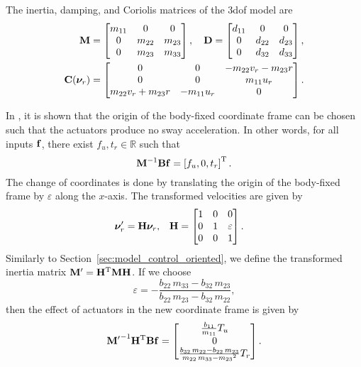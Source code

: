The inertia, damping, and Coriolis matrices of the 3\gls{dof} model are \cite{fredriksen_global_2006}
\begin{align}
    \mathbf{M} &= 
    \begin{bmatrix}
        m_{11} & 0 & 0 \\ 0 & m_{22} & m_{23} \\ 0 & m_{23} & m_{33}
    \end{bmatrix}, \quad
    \mathbf{D} =
    \begin{bmatrix}
        d_{11} & 0 & 0 \\ 0 & d_{22} & d_{23} \\ 0 & d_{32} & d_{33}
    \end{bmatrix}, \\
    \mathbf{C}(\bm{\nu}_r) &=
    \begin{bmatrix}
        0 & 0 & -m_{22}v_r - m_{23}r \\ 0 & 0 & m_{11}u_r \\ m_{22}v_r + m_{23}r & -m_{11}u_r & 0
    \end{bmatrix}.
\end{align}

In \cite{fredriksen_global_2006}, it is shown that the origin of the body-fixed coordinate frame can be chosen such that the actuators produce no sway acceleration.
In other words, for all inputs $\mathbf{f}$, there exist $f_u, t_r \in \mathbb{R}$ such that
\begin{equation}
    \mathbf{M}^{-1}\mathbf{B}\mathbf{f} = \left[f_u, 0, t_r\right]^{\mathrm{T}}.
\end{equation}
The change of coordinates is done by translating the origin of the body-fixed frame by $\varepsilon$ along the $x$-axis.
The transformed velocities are given by
\begin{align}
    \bm{\nu}_r^{\prime} &= \mathbf{H}\bm{\nu}_r, &
    \mathbf{H} &= 
    \begin{bmatrix}
        1 & 0 & 0 \\ 0 & 1 & \varepsilon \\ 0 & 0 & 1
    \end{bmatrix}.
\end{align}
Similarly to Section~\ref{sec:model_control_oriented}, we define the transformed inertia matrix $\mathbf{M}^{\prime} = \mathbf{H}^{\mathrm{T}}\mathbf{M}\mathbf{H}$.
If we choose
\begin{equation}
    \varepsilon = -\frac{b_{22}\,m_{33}-b_{32}\,m_{23}}{b_{22}\,m_{23}-b_{32}\,m_{22}},
\end{equation}
then the effect of actuators in the new coordinate frame is given by
\begin{equation}
    {\mathbf{M}^{\prime}}^{-1}\mathbf{H}^{\mathrm{T}}\mathbf{B}\mathbf{f}
    =
    \begin{bmatrix} \frac{b_{11}}{m_{11}} T_{u} \\ 0 \\ \frac{b_{32}\,m_{22}-b_{22}\,m_{23}}{m_{22}\,m_{33}-{m_{23}}^2} T_{r} \end{bmatrix}.
\end{equation}

